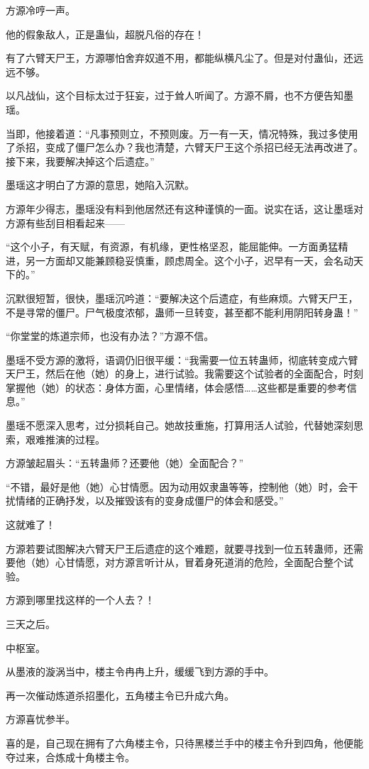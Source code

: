 \begin{this_body}
方源冷哼一声。

他的假象敌人，正是蛊仙，超脱凡俗的存在！

有了六臂天尸王，方源哪怕舍弃奴道不用，都能纵横凡尘了。但是对付蛊仙，还远远不够。

以凡战仙，这个目标太过于狂妄，过于耸人听闻了。方源不屑，也不方便告知墨瑶。

当即，他接着道：“凡事预则立，不预则废。万一有一天，情况特殊，我过多使用了杀招，变成了僵尸怎么办？我也清楚，六臂天尸王这个杀招已经无法再改进了。接下来，我要解决掉这个后遗症。”

墨瑶这才明白了方源的意思，她陷入沉默。

方源年少得志，墨瑶没有料到他居然还有这种谨慎的一面。说实在话，这让墨瑶对方源有些刮目相看起来——

“这个小子，有天赋，有资源，有机缘，更性格坚忍，能屈能伸。一方面勇猛精进，另一方面却又能兼顾稳妥慎重，顾虑周全。这个小子，迟早有一天，会名动天下的。”

沉默很短暂，很快，墨瑶沉吟道：“要解决这个后遗症，有些麻烦。六臂天尸王，不是寻常的僵尸。尸气极度浓郁，蛊师一旦转变，甚至都不能利用阴阳转身蛊！”

“你堂堂的炼道宗师，也没有办法？”方源不信。

墨瑶不受方源的激将，语调仍旧很平缓：“我需要一位五转蛊师，彻底转变成六臂天尸王，然后在他（她）的身上，进行试验。我需要这个试验者的全面配合，时刻掌握他（她）的状态：身体方面，心里情绪，体会感悟……这些都是重要的参考信息。”

墨瑶不愿深入思考，过分损耗自己。她故技重施，打算用活人试验，代替她深刻思索，艰难推演的过程。

方源皱起眉头：“五转蛊师？还要他（她）全面配合？”

“不错，最好是他（她）心甘情愿。因为动用奴隶蛊等等，控制他（她）时，会干扰情绪的正确抒发，以及摧毁该有的变身成僵尸的体会和感受。”

这就难了！

方源若要试图解决六臂天尸王后遗症的这个难题，就要寻找到一位五转蛊师，还需要他（她）心甘情愿，对方源言听计从，冒着身死道消的危险，全面配合整个试验。

方源到哪里找这样的一个人去？！

三天之后。

中枢室。

从墨液的漩涡当中，楼主令冉冉上升，缓缓飞到方源的手中。

再一次催动炼道杀招墨化，五角楼主令已升成六角。

方源喜忧参半。

喜的是，自己现在拥有了六角楼主令，只待黑楼兰手中的楼主令升到四角，他便能夺过来，合炼成十角楼主令。


\end{this_body}
